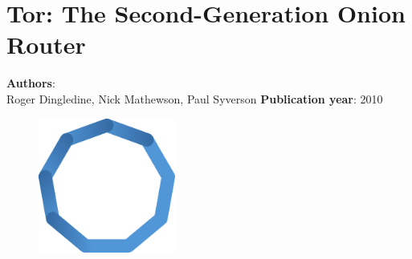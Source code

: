 \documentclass[11pt,fleqn]{book} %
\begin{document}
\chapter{Tor: The Second-Generation Onion Router}
\vspace*{-7mm}
\Large \textbf{Authors}: \\
Roger Dingledine, Nick Mathewson, Paul Syverson
\newline\newline
\textbf{Publication year}: 2010
\begin{figure}[b]
    \centering
    \includegraphics[width=0.4\textwidth]{distributed-systems-blue.pdf}
\end{figure}


\pagecolor{blue}\afterpage{}
\newpage\null\thispagestyle{empty}\newpage
\end{document}
